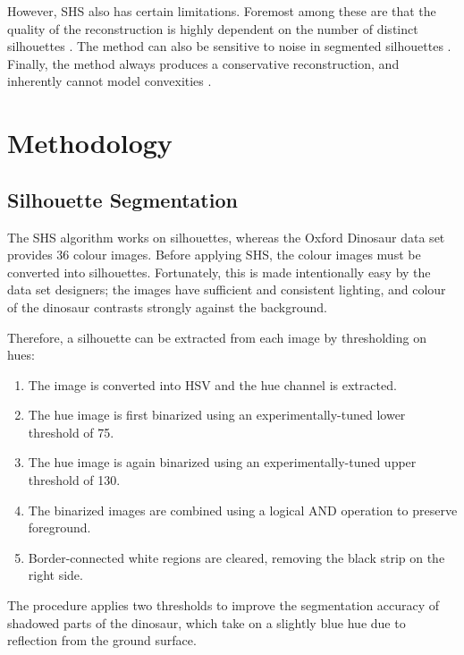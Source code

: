 However, SHS also has certain limitations. Foremost among these are that the quality of the reconstruction is highly dependent on the number of distinct silhouettes \cite{cheung_2005}. The method can also be sensitive to noise in segmented silhouettes \cite{lovell_2023b}. Finally, the method always produces a conservative reconstruction, and inherently cannot model convexities \cite{cheung_2005}.

\newpage
\section{Methodology}
\subsection{Silhouette Segmentation}

The SHS algorithm works on silhouettes, whereas the Oxford Dinosaur data set provides 36 colour images. Before applying SHS, the colour images must be converted into silhouettes. Fortunately, this is made intentionally easy by the data set designers; the images have sufficient and consistent lighting, and colour of the dinosaur contrasts strongly against the background.

Therefore, a silhouette can be extracted from each image by thresholding on hues:

\begin{enumerate}
  \item The image is converted into HSV and the hue channel is extracted.

  \item The hue image is first binarized using an experimentally-tuned lower threshold of 75.

  \item The hue image is again binarized using an experimentally-tuned upper threshold of 130.

  \item The binarized images are combined using a logical AND operation to preserve foreground.

  \item Border-connected white regions are cleared, removing the black strip on the right side.

\end{enumerate}

The procedure applies two thresholds to improve the segmentation accuracy of shadowed parts of the dinosaur, which take on a slightly blue hue due to reflection from the ground surface.


